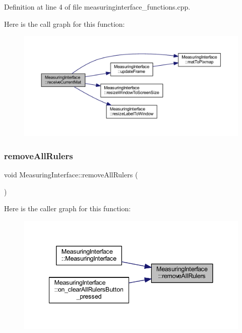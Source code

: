 Definition at line 4 of file measuringinterface\+\_\+functions.\+cpp.

Here is the call graph for this function\+:
\nopagebreak
\begin{figure}[H]
\begin{center}
\leavevmode
\includegraphics[width=350pt]{class_measuring_interface_a776a6aa345a738ee46e84c272fd35ce7_cgraph}
\end{center}
\end{figure}
\mbox{\label{class_measuring_interface_afc88c0d8a1a77e188aa000e2efb1cc80}} 
\subsubsection{\texorpdfstring{removeAllRulers}{removeAllRulers}}
{\footnotesize\ttfamily void Measuring\+Interface\+::remove\+All\+Rulers (\begin{DoxyParamCaption}{ }\end{DoxyParamCaption})\hspace{0.3cm}{\ttfamily [signal]}}

Here is the caller graph for this function\+:
\nopagebreak
\begin{figure}[H]
\begin{center}
\leavevmode
\includegraphics[width=341pt]{class_measuring_interface_afc88c0d8a1a77e188aa000e2efb1cc80_icgraph}
\end{center}
\end{figure}
\mbox{\label{class_measuring_interface_afe9e0efd285c9239d38d2fa9b9d8ff43}} 
